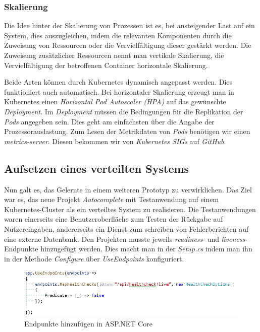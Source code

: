 \documentclass[12pt,a4paper]{scrartcl}
\begin{document}
\subsubsection{Skalierung} 

Die Idee hinter der Skalierung von Prozessen ist es, bei ansteigender Last auf ein System, dies auszugleichen, indem die relevanten Komponenten durch die Zuweisung von Ressourcen oder die Vervielfältigung dieser gestärkt werden.
Die Zuweisung zusätzlicher Ressourcen nennt man vertikale Skalierung\cite{k8sVpa}, die Vervielfältigung der betroffenen Container horizontale Skalierung.

Beide Arten können durch Kubernetes dynamisch angepasst werden. Dies funktioniert auch automatisch. Bei horizontaler Skalierung erzeugt man in Kubernetes einen \emph{Horizontal Pod Autoscaler (HPA)}\cite{k8sHpa} auf das gewünschte \emph{Deployment}. Im \emph{Deployment} müssen die Bedingungen für die Replikation der \emph{Pods} angegeben sein. Dies geht am einfachsten über die Angabe der Prozessorauslastung. Zum Lesen der Metrikdaten von \emph{Pods} benötigen wir einen \emph{metrics-server}.\cite{k8sHPA} Diesen bekommen wir von \emph{Kubernetes SIGs} auf \emph{GitHub}\cite{github}.

\subsection{Aufsetzen eines verteilten Systems}

Nun galt es, das Gelernte in einem weiteren Prototyp zu verwirklichen. Das Ziel war es, das neue Projekt \emph{Autocomplete} mit Testanwendung auf einem Kubernetes-Cluster als ein verteiltes System zu realisieren. Die Testanwendungen waren einerseits eine Benutzeroberfläche zum Testen der Rückgabe auf Nutzereingaben, andererseits ein Dienst zum schreiben von Fehlerberichten auf eine externe Datenbank.
Den Projekten musste jeweils \emph{readiness}- und \emph{liveness}-Endpunkte hinzugefügt werden. Dies macht man in der \emph{Setup.cs} indem man ihn in der Methode \emph{Configure} über \emph{UseEndpoints} konfiguriert. 

\begin{figure}[h!]
	\centering
	\includegraphics[scale=1]{CsEndpoint.png}
	\caption[Endpunkte hinzufügen in ASP.NET Core]{Endpunkte hinzufügen in ASP.NET Core}
\end{figure}
\end{document}
